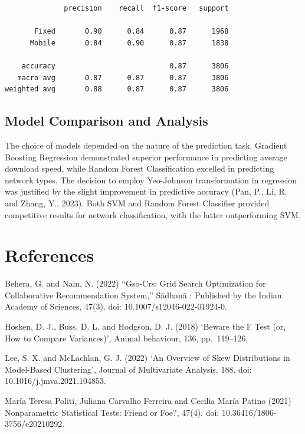 \documentclass[
  letterpaper,
  DIV=11,
  numbers=noendperiod,
  oneside]{scrartcl}
\begin{document}
\begin{verbatim}
              precision    recall  f1-score   support

       Fixed       0.90      0.84      0.87      1968
      Mobile       0.84      0.90      0.87      1838

    accuracy                           0.87      3806
   macro avg       0.87      0.87      0.87      3806
weighted avg       0.88      0.87      0.87      3806
\end{verbatim}

\hypertarget{model-comparison-and-analysis}{%
\subsection{Model Comparison and
Analysis}\label{model-comparison-and-analysis}}

The choice of models depended on the nature of the prediction task.
Gradient Boosting Regression demonstrated superior performance in
predicting average download speed, while Random Forest Classification
excelled in predicting network types. The decision to employ Yeo-Johnson
transformation in regression was justified by the slight improvement in
predictive accuracy (Pan, P., Li, R. and Zhang, Y., 2023). Both SVM and
Random Forest Classifier provided competitive results for network
classification, with the latter outperforming SVM.

\hypertarget{references}{%
\section*{References}\label{references}}

Behera, G. and Nain, N. (2022) ``Gso-Crs: Grid Search Optimization for
Collaborative Recommendation System,'' Sādhanā : Published by the Indian
Academy of Sciences, 47(3). doi: 10.1007/s12046-022-01924-0.

Hosken, D. J., Buss, D. L. and Hodgson, D. J. (2018) `Beware the F Test
(or, How to Compare Variances)', Animal behaviour, 136, pp.~119--126.

Lee, S. X. and McLachlan, G. J. (2022) `An Overview of Skew
Distributions in Model-Based Clustering', Journal of Multivariate
Analysis, 188. doi: 10.1016/j.jmva.2021.104853.

María Teresa Politi, Juliana Carvalho Ferreira and Cecilia María Patino
(2021) Nonparametric Statistical Tests: Friend or Foe?, 47(4). doi:
10.36416/1806-3756/e20210292.
\end{document}
